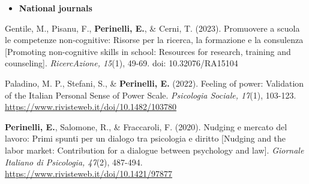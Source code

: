 \documentclass[hidelinks, letterpaper,10pt]{article} %
\begin{document}
\begin{itemize}
	\setlength{\topsep}{0pt}%
	\setlength{\leftmargin}{0.1in}%
	\setlength{\listparindent}{-0.1in}%
	\setlength{\itemindent}{-0.2in}%
	\setlength{\parsep}{\parskip}%
	
	\item {\textbf{\large{National journals}}}
\end{itemize}
\begin{etaremune}
	\item Gentile, M., Pisanu, F., \textbf{Perinelli, E.}, \& Cerni, T. (2023). Promuovere a scuola le competenze non-cognitive: Risorse per la ricerca, la formazione e la consulenza [Promoting non-cognitive skills in school: Resources for research, training and counseling]. \textit{RicercAzione, 15}(1), 49-69. doi: 10.32076/RA15104

	\item Paladino, M. P., Stefani, S., \& \textbf{Perinelli, E.} (2022). Feeling of power: Validation of the Italian Personal Sense of Power Scale. \textit{Psicologia Sociale, 17}(1), 103-123. \url{https://www.rivisteweb.it/doi/10.1482/103780}

	\item \textbf{Perinelli, E.}, Salomone, R., \& Fraccaroli, F. (2020). Nudging e mercato del lavoro: Primi spunti per un dialogo tra psicologia e diritto [Nudging and the labor market: Contribution for a dialogue between psychology and law]. \textit{Giornale Italiano di Psicologia, 47}(2), 487-494. \url{https://www.rivisteweb.it/doi/10.1421/97877}
\end{etaremune}
\vspace{3mm}
\end{document}
